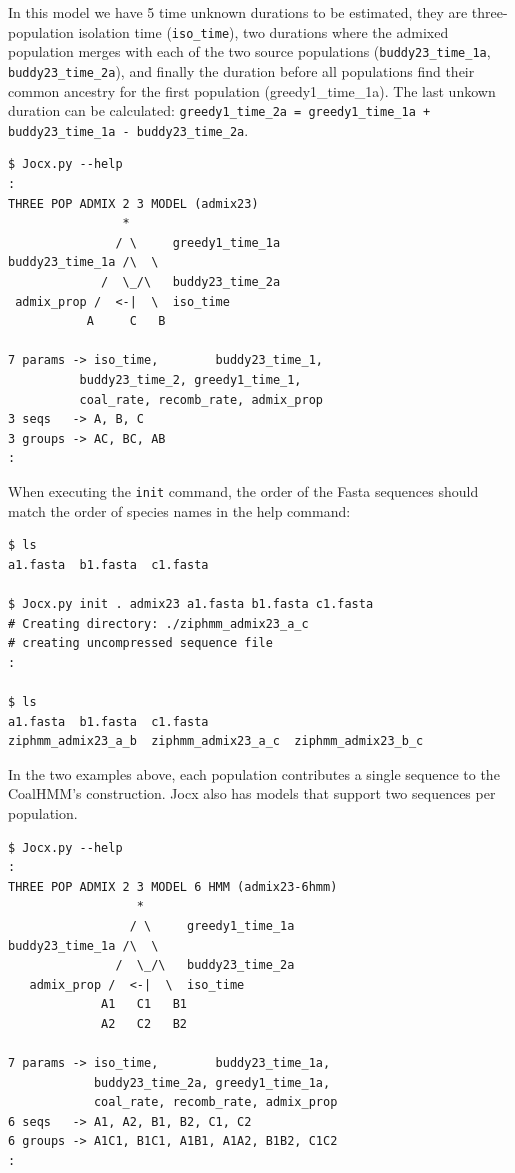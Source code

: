 \documentclass[graybox]{svmult}
\begin{document}

In this model we have 5 time unknown durations to be estimated, they are three-population isolation time (\texttt{iso\_time}), two durations where the admixed population merges with each of the two source populations (\texttt{buddy23\_time\_1a}, \texttt{buddy23\_time\_2a}), and finally the duration before all populations find their common ancestry for the first population (greedy1\_time\_1a).  The last unkown duration can be calculated: \texttt{greedy1\_time\_2a = greedy1\_time\_1a + buddy23\_time\_1a - buddy23\_time\_2a}.

 {\scriptsize{}\begin{verbatim}
$ Jocx.py --help
:
THREE POP ADMIX 2 3 MODEL (admix23)
                *
               / \     greedy1_time_1a
buddy23_time_1a /\  \
             /  \_/\   buddy23_time_2a
 admix_prop /  <-|  \  iso_time
           A     C   B

7 params -> iso_time,        buddy23_time_1,
          buddy23_time_2, greedy1_time_1,
          coal_rate, recomb_rate, admix_prop
3 seqs   -> A, B, C
3 groups -> AC, BC, AB
:
\end{verbatim}}

When executing the \texttt{init} command, the order of the Fasta sequences should match the order of species names in the help command:

 {\scriptsize{}\begin{verbatim}
$ ls
a1.fasta  b1.fasta  c1.fasta

$ Jocx.py init . admix23 a1.fasta b1.fasta c1.fasta
# Creating directory: ./ziphmm_admix23_a_c
# creating uncompressed sequence file
:

$ ls
a1.fasta  b1.fasta  c1.fasta
ziphmm_admix23_a_b  ziphmm_admix23_a_c  ziphmm_admix23_b_c
\end{verbatim}}

In the two examples above, each population contributes a single sequence to the CoalHMM's construction. Jocx also has models that support two sequences per population.

 {\scriptsize{}\begin{verbatim}
$ Jocx.py --help
:
THREE POP ADMIX 2 3 MODEL 6 HMM (admix23-6hmm)
                  *
                 / \     greedy1_time_1a
buddy23_time_1a /\  \
               /  \_/\   buddy23_time_2a
   admix_prop /  <-|  \  iso_time
             A1   C1   B1
             A2   C2   B2

7 params -> iso_time,        buddy23_time_1a,
            buddy23_time_2a, greedy1_time_1a,
            coal_rate, recomb_rate, admix_prop
6 seqs   -> A1, A2, B1, B2, C1, C2
6 groups -> A1C1, B1C1, A1B1, A1A2, B1B2, C1C2
:
\end{verbatim}}
\end{document}

